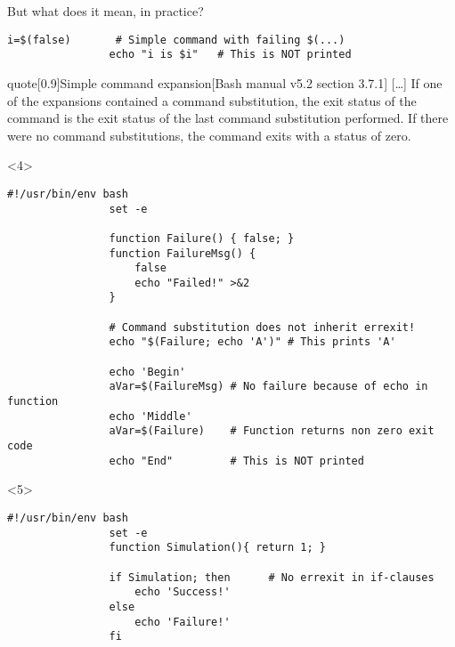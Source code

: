 \begin{frame}[fragile]{But what does it mean, in practice?}
\begin{overlayarea}{\textwidth}{0.7\textheight}
\begin{onlyenv}
\begin{lstlisting}[style=myBash]
                i=$(false)       # Simple command with failing $(...)
                echo "i is $i"   # This is NOT printed
            \end{lstlisting}
            \footnotesize
            \begin{varblock}{quote}[0.9\textwidth]{Simple command expansion}[\footnotesize Bash manual v5.2 section 3.7.1]
                \scriptsize[\ldots]
                If one of the expansions contained a command substitution, the exit status of the command is the exit status of the last command substitution performed.
                If there were no command substitutions, the command exits with a status of zero.
            \end{varblock}
        \end{onlyenv}
        \begin{onlyenv}<4>
            \begin{lstlisting}[style=myBash]
                #!/usr/bin/env bash
                set -e

                function Failure() { false; }
                function FailureMsg() {
                    false
                    echo "Failed!" >&2
                }

                # Command substitution does not inherit errexit!
                echo "$(Failure; echo 'A')" # This prints 'A'

                echo 'Begin'
                aVar=$(FailureMsg) # No failure because of echo in function
                echo 'Middle'
                aVar=$(Failure)    # Function returns non zero exit code
                echo "End"         # This is NOT printed
            \end{lstlisting}
            \PrepareURLsymbol[PB]
        \end{onlyenv}
        \begin{onlyenv}<5>
            \begin{lstlisting}[style=myBash]
                #!/usr/bin/env bash
                set -e
                function Simulation(){ return 1; }

                if Simulation; then      # No errexit in if-clauses
                    echo 'Success!'
                else
                    echo 'Failure!'
                fi


\end{lstlisting}
\end{onlyenv}
\end{overlayarea}
\end{frame}
